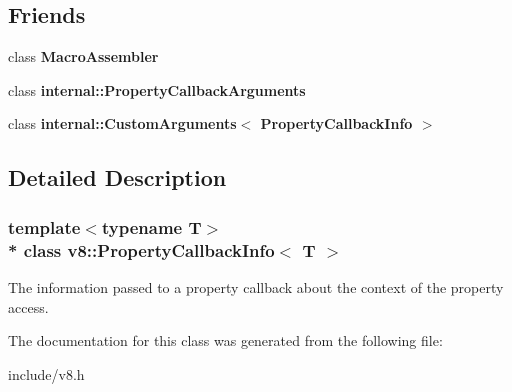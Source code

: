 \subsection*{Friends}
\begin{DoxyCompactItemize}
\item 
class {\bfseries Macro\+Assembler}\hypertarget{classv8_1_1_property_callback_info_ae605ff1d9d93250ace8a0a8b8d1dee67}{}\label{classv8_1_1_property_callback_info_ae605ff1d9d93250ace8a0a8b8d1dee67}

\item 
class {\bfseries internal\+::\+Property\+Callback\+Arguments}\hypertarget{classv8_1_1_property_callback_info_a1ba96a1268a72c23f50314cd99c76f1b}{}\label{classv8_1_1_property_callback_info_a1ba96a1268a72c23f50314cd99c76f1b}

\item 
class {\bfseries internal\+::\+Custom\+Arguments$<$ Property\+Callback\+Info $>$}\hypertarget{classv8_1_1_property_callback_info_ad1d1e15ddaed2ab44e8f21c5564881ba}{}\label{classv8_1_1_property_callback_info_ad1d1e15ddaed2ab44e8f21c5564881ba}

\end{DoxyCompactItemize}


\subsection{Detailed Description}
\subsubsection*{template$<$typename T$>$\\*
class v8\+::\+Property\+Callback\+Info$<$ T $>$}

The information passed to a property callback about the context of the property access. 

The documentation for this class was generated from the following file\+:\begin{DoxyCompactItemize}
\item 
include/v8.\+h\end{DoxyCompactItemize}
